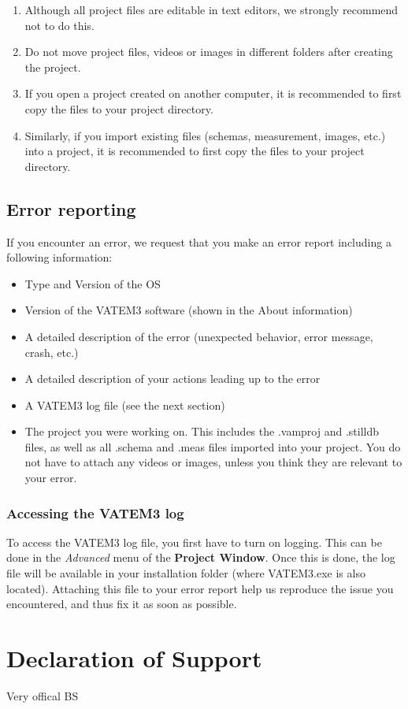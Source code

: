 \documentclass[10pt,a4paper,oneside]{report}             %
\begin{document}
\begin{enumerate}
	\item Although all project files are editable in text editors, we strongly recommend not to do this.
	\item Do not move project files, videos or images in different folders after creating the project.
	\item If you open a project created on another computer, it is recommended to first copy the files to your project directory.
	\item Similarly, if you import existing files (schemas, measurement, images, etc.) into a project, it is recommended to first copy the files to your project directory.
\end{enumerate}


\section{Error reporting}

If you encounter an error, we request that you make an error report including a following information:

\begin{itemize}
	\item Type and Version of the OS
	\item Version of the VATEM3 software (shown in the About information)
	\item A detailed description of the error (unexpected behavior, error message, crash, etc.)
	\item A detailed description of your actions leading up to the error
	\item A VATEM3 log file (see the next section)
	\item The project you were working on. This includes the .vamproj and .stilldb files, as well as all .schema and .meas files imported into your project. You do not have to attach any videos or images, unless you think they are relevant to your error.
\end{itemize}

\subsection{Accessing the VATEM3 log}

To access the VATEM3 log file, you first have to turn on logging. This can be done in the \textit{Advanced} menu of the \textbf{Project Window}. Once this is done, the log file will be available in your installation folder (where VATEM3.exe is also located). Attaching this file to your error report help us reproduce the issue you encountered, and thus fix it as soon as possible.

\chapter*{Declaration of Support}

Very offical BS

\nocite{*}
\printbibliography[title=Acknowledgements,heading=bibliography,keyword=0]


\label{page:last}
\end{document}
